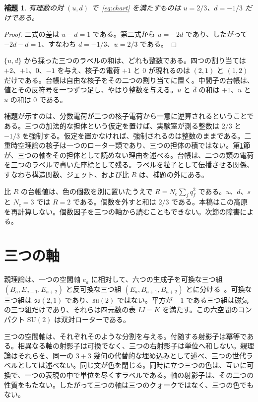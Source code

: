 \documentclass[a4paper]{article}
\newtheorem{lemma}{補題}
\begin{document}
\begin{lemma}
\label{lem:chart}
有理数の対 \((u,d)\) で~\eqref{eq:chart} を満たすものは \(u=2/3\)、\(d=-1/3\) だけである。
\end{lemma}

\begin{proof}
二式の差は \(u-d=1\) である。第二式から \(u=-2d\) であり、したがって \(-2d-d=1\)、すなわち \(d=-1/3\)、\(u=2/3\) である。
\end{proof}

\(\{u,d\}\) から採った三つのラベルの和は、どれも整数である。四つの割り当ては \(+2\)、\(+1\)、\(0\)、\(-1\) を与え、核子の電荷 \(+1\) と \(0\) が現れるのは \((2,1)\) と \((1,2)\) だけである。台帳は自由な核子をその二つの割り当てに置く。中間子の台帳は、値とその反符号を一つずつ足し、やはり整数を与える。\(u\) と \(\bar d\) の和は \(+1\)、\(u\) と \(\bar u\) の和は \(0\) である。

補題が示すのは、分数電荷が二つの核子電荷から一意に逆算されるということである。三つの加法的な担体という仮定を置けば、実験室が測る整数は \(2/3\) と \(-1/3\) を強制する。仮定を置かなければ、強制されるのは整数のままである。二重時空理論の核子は一つのローター類であり、三つの担体の積ではない。第\ref{sec:axes}節が、三つの軸をその担体として読めない理由を述べる。台帳は、二つの類の電荷を三つのラベルで書いた座標として残る。ラベルを粒子として伝播させる関係、すなわち構造関数、ジェット、および比 \(R\) は、補題の外にある。

比 \(R\) の台帳値は、色の個数を別に置いたうえで \(R=N_c\sum_f q_f^2\) である。\(u\)、\(d\)、\(s\) と \(N_c=3\) では \(R=2\) である。個数を外すと和は \(2/3\) である。本稿はこの高原を再計算しない。個数因子を三つの軸から読むこともできない。次節の障害による。

\section{三つの軸}
\label{sec:axes}

親理論は、一つの空間軸 \(e_a\) に相対して、六つの生成子を可換な三つ組 \((B_a,E_{a+1},E_{a+2})\) と反可換な三つ組 \((E_a,B_{a+1},B_{a+2})\) とに分ける~\cite{dst-main}。可換な三つ組は \(\mathfrak{so}(2,1)\) であり、\(\mathfrak{su}(2)\) ではない。平方が \(-1\) である三つ組は磁気の三つ組だけであり、それらは四元数の表 \(IJ=K\) を満たす。この六空間のコンパクト \(\mathrm{SU}(2)\) は双対ローターである。

三つの空間軸は、それぞれそのような分割を与える。付随する射影子は冪等である。相異なる軸の射影子は可換でなく、三つの右射影子は単位へ和しない。親理論はそれらを、同一の \(3+3\) 幾何の代替的な埋め込みとして述べ、三つの世代ラベルとしては述べない。同じ文が色を閉じる。同時に立つ三つの色は、互いに可換で、一つの表現の中で単位を尽くすラベルである。軸の射影子は、その二つの性質をもたない。したがって三つの軸は三つのクォークではなく、三つの色でもない。
\end{document}
